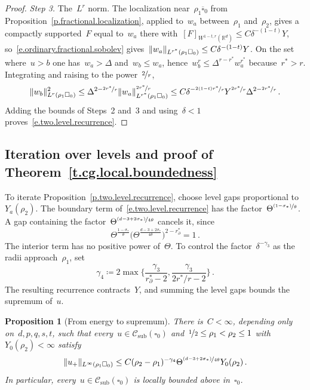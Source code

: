 \documentclass[11pt,letterpaper]{article}
\numberwithin{equation}{section}
\newtheorem{proposition}[theorem]{Proposition}
\theoremstyle{definition}
\newcommand{\Rd}{\mathbb{R}^d}
\newcommand{\nf}{\nicefrac}
\newcommand{\cu}{\square}
\DeclarePairedDelimiter{\norm}{\lVert}{\rVert}
\newcommand{\Csub}{\mathcal C_{\mathrm{sub}}}
\begin{document}
\begin{proof}
\smallskip

\emph{Step 3.} The~$L^r$ norm. The localization near~$\rho_1\overline{\cu}_0$ from Proposition~\ref{p.fractional.localization}, applied to~$w_a$ between~$\rho_1$ and~$\rho_2$, gives a compactly supported~$F$ equal to~$w_a$ there with~$[F]_{W^{1-t,r}(\Rd)}\leq C\delta^{-(1-t)}Y$, so~\eqref{e.ordinary.fractional.sobolev} gives~$\norm{w_a}_{L^{r^*}(\rho_1\cu_0)}\leq C\delta^{-(1-t)}Y$. On the set where~$u>b$ one has~$w_a>\Delta$ and~$w_b\leq w_a$, hence~$w_b^r\leq\Delta^{r-r^*}w_a^{r^*}$ because~$r^*>r$. Integrating and raising to the power~$\nf2r$,
\begin{equation*}
	\norm{w_b}_{L^r(\rho_1\cu_0)}^2\leq\Delta^{2-\nf{2r^*}r}\norm{w_a}_{L^{r^*}(\rho_1\cu_0)}^{\nf{2r^*}r}\leq C\delta^{-\nf{2(1-t)r^*}r}Y^{\nf{2r^*}r}\Delta^{2-\nf{2r^*}r}\,.
\end{equation*}
Adding the bounds of Steps~2 and~3 and using~$\delta<1$ proves~\eqref{e.two.level.recurrence}.
\end{proof}

\subsection{Iteration over levels and proof of Theorem~\ref{t.cg.local.boundedness}}

To iterate Proposition~\ref{p.two.level.recurrence}, choose level gaps proportional to~$Y_a(\rho_2)$. The boundary term of~\eqref{e.two.level.recurrence} has the factor~$\Theta^{\nf{(1-\sigma_*)}\theta}$. A gap containing the factor~$\Theta^{\nf{(d-3+2\sigma_*)}{4\theta}}$ cancels it, since
\begin{equation*}
	\Theta^{\frac{1-\sigma_*}{\theta}}\bigl(\Theta^{\frac{d-3+2\sigma_*}{4\theta}}\bigr)^{2-r_\partial^*}=1\,.
\end{equation*}
The interior term has no positive power of~$\Theta$. To control the factor~$\delta^{-\gamma_3}$ as the radii approach~$\rho_1$, set
\begin{equation*}
	\gamma_4\coloneqq2\max\biggl\{\frac{\gamma_3}{r_\partial^*-2},\frac{\gamma_3}{2r^*/r-2}\biggr\}\,.
\end{equation*}
The resulting recurrence contracts~$Y$, and summing the level gaps bounds the supremum of~$u$.

\begin{proposition}[From energy to supremum]
\label{p.energy.to.sup}
There is~$C<\infty$, depending only on~$d,p,q,s,t$, such that every~$u\in\Csub(\cu_0)$ and~$\nf12\leq\rho_1<\rho_2\leq1$ with~$Y_0(\rho_2)<\infty$ satisfy
\begin{equation}
	\norm{u_+}_{L^\infty(\rho_1\cu_0)}\leq C(\rho_2-\rho_1)^{-\gamma_4}\Theta^{\nf{(d-3+2\sigma_*)}{4\theta}}Y_0(\rho_2)\,.
	\label{e.energy.to.sup}
\end{equation}
In particular, every~$u\in\Csub(\cu_0)$ is locally bounded above in~$\cu_0$.
\end{proposition}
\end{document}
